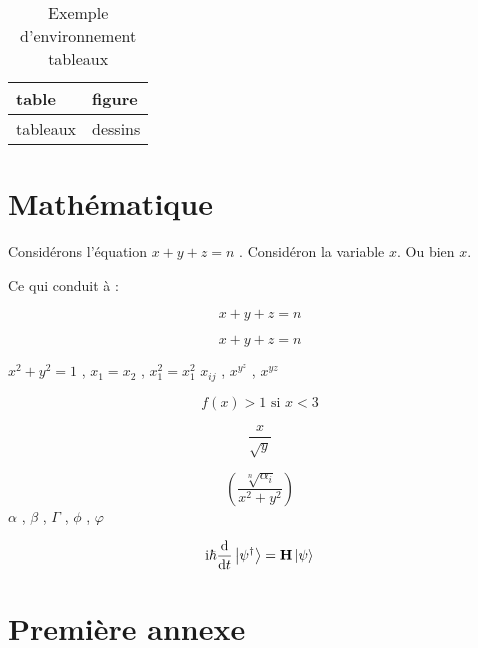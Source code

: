 \documentclass[a4paper,11pt]{article}
\begin{document}
\begin{table}[!htbp] %
\centering
\begin{tabular}{|l|l|}
\hline
table      & figure   \\
\hline
tableaux & dessins \\
\hline
\end{tabular}
\caption{Exemple d'environnement tableaux}
\label{tableau/exemple}
\end{table}

\section{Mathématique}
Considérons l'équation \begin{math} x + y + z = n \end{math} .
Considéron la variable $ x $. Ou bien \( x\).

Ce qui conduit à :

\begin{displaymath}
x + y + z = n
\end{displaymath}

\[
x+y+z=n
\]

$ x^2 +y^2=1 $ , $ x_1 = x_2 $ , $ x_1^2=x^2_1 $
$ x_{ij} $ , $ x^{y^z} $ , $ x^{yz} $

\[
f(x) > 1 \mbox{ si } x < 3 %
\]

\[
\frac{x}{\sqrt{y}}
\]

\[
\left (\frac{\sqrt[n]{\alpha_i}}{x^2+y^2}\right )
\]
$ \alpha $ , $\beta $ , $\Gamma$ , $\phi$ , $\varphi$

\[
\mathrm{i}\hbar\frac{\mathrm{d}}{\mathrm{d}t} \ket{\psi^\dagger}= \mathbf{H} \ket{\psi}
\]


\appendix
\section{Première annexe}
\end{document}
